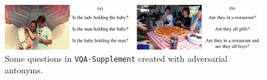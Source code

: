 \begin{figure}[t]
    \centering
    \includegraphics[width=\linewidth]{vqalol/images/illus.pdf}
    \caption{Some questions in \texttt{VQA-Supplement} created with adversarial antonyms.}
    \label{fig:illus}
\end{figure}